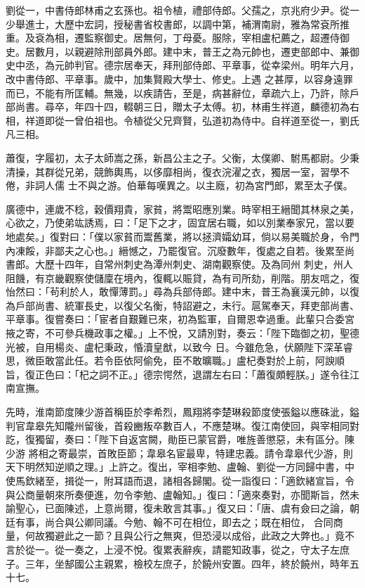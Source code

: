 \begin{pinyinscope}
 劉從一，中書侍郎林甫之玄孫也。祖令植，禮部侍郎。父孺之，京兆府少尹。從一少舉進士，大歷中宏詞，授秘書省校書郎，以調中第，補渭南尉，雅為常袞所推重。及袞為相，遷監察御史。居無何，丁母憂。服除，宰相盧杞薦之，超遷侍御史。居數月，以親避除刑部員外郎。建中末，普王之為元帥也，遷吏部郎中、兼御史中丞，為元帥判官。德宗居奉天，拜刑部侍郎、平章事，從幸梁州。明年六月，改中書侍郎、平章事。歲中，加集賢殿大學士、修史。上遇
 之甚厚，以容身遠罪而已，不能有所匡輔。無幾，以疾請告，至是，病甚辭位，章疏六上，乃許，除戶部尚書。尋卒，年四十四，輟朝三日，贈太子太傅。初，林甫生祥道，麟德初為右相，祥道即從一曾伯祖也。令植從父兄齊賢，弘道初為侍中。自祥道至從一，劉氏凡三相。



 蕭復，字履初，太子太師嵩之孫，新昌公主之子。父衡，太僕卿、駙馬都尉。少秉清操，其群從兄弟，競飾輿馬，以侈靡相尚，復衣浣濯之衣，獨居一室，習學不倦，非詞人儒
 士不與之游。伯華每嘆異之。以主廕，初為宮門郎，累至太子僕。



 廣德中，連歲不稔，穀價翔貴，家貧，將鬻昭應別業。時宰相王縉聞其林泉之美，心欲之，乃使弟竑誘焉，曰：「足下之才，固宜居右職，如以別業奉家兄，當以要地處矣。」復對曰：「僕以家貧而鬻舊業，將以拯濟孀幼耳，倘以易美職於身，令門內凍餒，非鄙夫之心也。」縉憾之，乃罷復官。沉廢數年，復處之自若。後累至尚書郎。大歷十四年，自常州刺史為潭州刺史、湖南觀察使。及為同州
 刺史，州人阻饑，有京畿觀察使儲廩在境內，復輒以賑貸，為有司所劾，削階。朋友唁之，復怡然曰：「茍利於人，敢憚薄罰。」尋為兵部侍郎。建中末，普王為襄漢元帥，以復為戶部尚書、統軍長史，以復父名衡，特詔避之，未行。扈駕奉天，拜吏部尚書、平章事。復嘗奏曰：「宦者自艱難已來，初為監軍，自爾恩幸過重。此輩只合委宮掖之寄，不可參兵機政事之權。」上不悅，又請別對，奏云：「陛下臨御之初，聖德光被，自用楊炎、盧杞秉政，惛瀆皇猷，以致今
 日。今雖危急，伏願陛下深革睿思，微臣敢當此任。若令臣依阿偷免，臣不敢曠職。」盧杞奏對於上前，阿諛順旨，復正色曰：「杞之詞不正。」德宗愕然，退謂左右曰：「蕭復頗輕朕。」遂令往江南宣撫。



 先時，淮南節度陳少游首稱臣於李希烈，鳳翔將李楚琳殺節度使張鎰以應硃泚，鎰判官韋皋先知隴州留後，首殺豳叛卒數百人，不應楚琳。復江南使回，與宰相同對訖，復獨留，奏曰：「陛下自返宮闕，勛臣已蒙官爵，唯旌善懲惡，未有區分。陳少游
 將相之寄最崇，首敗臣節；韋皋名宦最卑，特建忠義。請令韋皋代少游，則天下明然知逆順之理。」上許之。復出，宰相李勉、盧翰、劉從一方同歸中書，中使馬欽緒至，揖從一，附耳語而退，諸相各歸閣。從一詣復曰：「適欽緒宣旨，令與公商量朝來所奏便進，勿令李勉、盧翰知。」復曰：「適來奏對，亦聞斯旨，然未諭聖心，已面陳述，上意尚爾，復未敢言其事。」復又曰：「唐、虞有僉曰之論，朝廷有事，尚合與公卿同議。今勉、翰不可在相位，即去之；既在相位，
 合同商量，何故獨避此之一節？且與公行之無爽，但恐浸以成俗，此政之大弊也。」竟不言於從一。從一奏之，上浸不悅。復累表辭疾，請罷知政事，從之，守太子左庶子。三年，坐郜國公主親累，檢校左庶子，於饒州安置。四年，終於饒州，時年五十七。




\end{pinyinscope}
